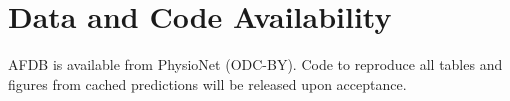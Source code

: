 \documentclass[conference,a4paper]{IEEEtran}
\begin{document}
\section*{Data and Code Availability}
AFDB is available from PhysioNet (ODC-BY).
\ifblind
Code to reproduce all tables and figures from cached predictions will be released upon acceptance.
\fi



\end{document}
